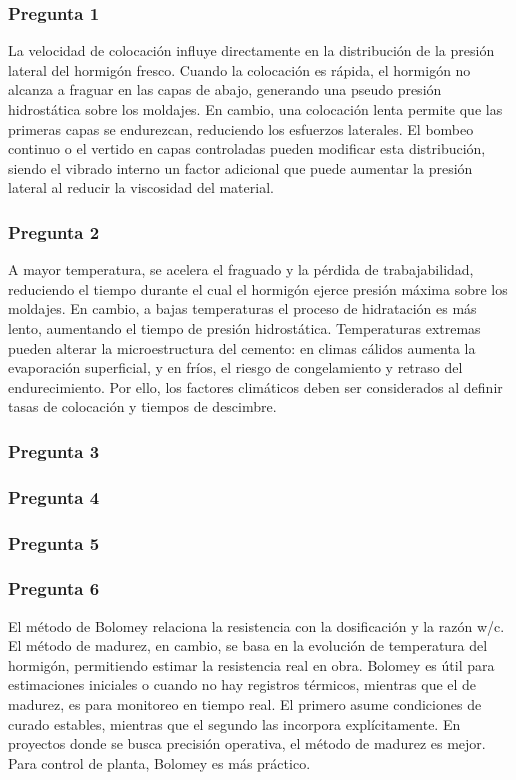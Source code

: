 \subsubsection*{Pregunta 1} 
La velocidad de colocación influye directamente en la distribución de la presión lateral del hormigón fresco. Cuando la colocación es rápida, el hormigón no alcanza a fraguar en las capas de abajo, generando una pseudo presión hidrostática sobre los moldajes. En cambio, una colocación lenta permite que las primeras capas se endurezcan, reduciendo los esfuerzos laterales. El bombeo continuo o el vertido en capas controladas pueden modificar esta distribución, siendo el vibrado interno un factor adicional que puede aumentar la presión lateral al reducir la viscosidad del material.

\subsubsection*{Pregunta 2} 
A mayor temperatura, se acelera el fraguado y la pérdida de trabajabilidad, reduciendo el tiempo durante el cual el hormigón ejerce presión máxima sobre los moldajes. En cambio, a bajas temperaturas el proceso de hidratación es más lento, aumentando el tiempo de presión hidrostática. Temperaturas extremas pueden alterar la microestructura del cemento: en climas cálidos aumenta la evaporación superficial, y en fríos, el riesgo de congelamiento y retraso del endurecimiento. Por ello, los factores climáticos deben ser considerados al definir tasas de colocación y tiempos de descimbre.

\subsubsection*{Pregunta 3} 

\subsubsection*{Pregunta 4} 

\subsubsection*{Pregunta 5} 

\subsubsection*{Pregunta 6} 
El método de Bolomey relaciona la resistencia con la dosificación y la razón w/c. El método de madurez, en cambio, se basa en la evolución de temperatura del hormigón, permitiendo estimar la resistencia real en obra. Bolomey es útil para estimaciones iniciales o cuando no hay registros térmicos, mientras que el de madurez, es para monitoreo en tiempo real. El primero asume condiciones de curado estables, mientras que el segundo las incorpora explícitamente. En proyectos donde se busca precisión operativa, el método de madurez es mejor. Para control de planta, Bolomey es más práctico.

